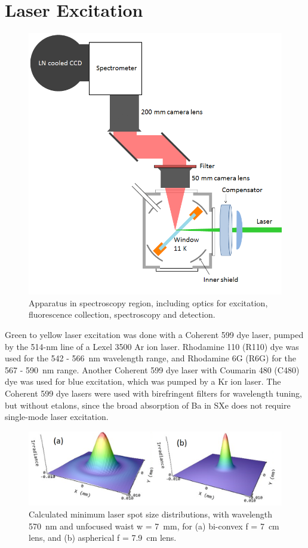 
\section{Laser Excitation}

\begin{figure} %
        \centering
                \includegraphics[width=.7\textwidth]{figures/window_etc_justOptics.png}
                \caption{Apparatus in spectroscopy region, including optics for excitation, fluorescence collection, spectroscopy and detection.}
\label{fig:endOfBeamOptics}
\end{figure}

Green to yellow laser excitation was done with a Coherent 599 dye laser, pumped by the 514-nm line of a Lexel 3500 Ar ion laser.  Rhodamine 110 (R110) dye was used for the 542 - 566~nm wavelength range, and Rhodamine 6G (R6G) for the 567 - 590~nm range.  Another Coherent 599 dye laser with Coumarin 480 (C480) dye was used for blue excitation, which was pumped by a Kr ion laser.  The Coherent 599 dye lasers were used with birefringent filters for wavelength tuning, but without etalons, since the broad absorption of Ba in SXe does not require single-mode laser excitation.

\begin{figure} %
        \centering
                \includegraphics[width=.7\textwidth]{figures/DFairbank_aber.png}
                \caption{Calculated minimum laser spot size distributions, with wavelength 570~nm and unfocused waist w = 7~mm, for (a) bi-convex f = 7~cm lens, and (b) aspherical f = 7.9~cm lens.}
\label{fig:DFairbank}
\end{figure}


